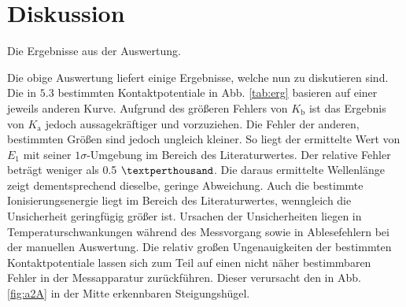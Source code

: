 
\section{Diskussion}
\label{sec:Diskussion}
\begin{table}
	\caption{Die Ergebnisse aus der Auswertung.}
	\centering
	
	\label{tab:erg}
\end{table}
Die obige Auswertung liefert einige Ergebnisse, welche nun zu diskutieren sind.
 Die in $5.3$ bestimmten Kontaktpotentiale in Abb. \ref{tab:erg} basieren auf einer
jeweils anderen Kurve. Aufgrund des größeren Fehlers von $K_\text{b}$ ist das
Ergebnis von $K_\text{a}$ jedoch aussagekräftiger und vorzuziehen. Die Fehler der anderen, bestimmten
Größen sind jedoch ungleich kleiner.
So liegt der ermittelte Wert von $E_1$ mit seiner $1\sigma$-Umgebung im
Bereich des Literaturwertes. Der relative Fehler beträgt weniger als 0.5 $\textperthousand$.
Die daraus ermittelte Wellenlänge zeigt dementsprechend dieselbe, geringe Abweichung. Auch die
 bestimmte Ionisierungsenergie liegt im Bereich des Literaturwertes, wenngleich die Unsicherheit geringfügig größer ist.
Ursachen der Unsicherheiten liegen in Temperaturschwankungen während des
Messvorgang sowie in Ablesefehlern bei der manuellen Auswertung. Die relativ
großen Ungenauigkeiten der bestimmten Kontaktpotentiale lassen sich zum Teil auf einen nicht näher bestimmbaren Fehler
in der Messapparatur zurückführen. Dieser verursacht den in Abb. \ref{fig:a2A}
in der Mitte erkennbaren Steigungshügel.
